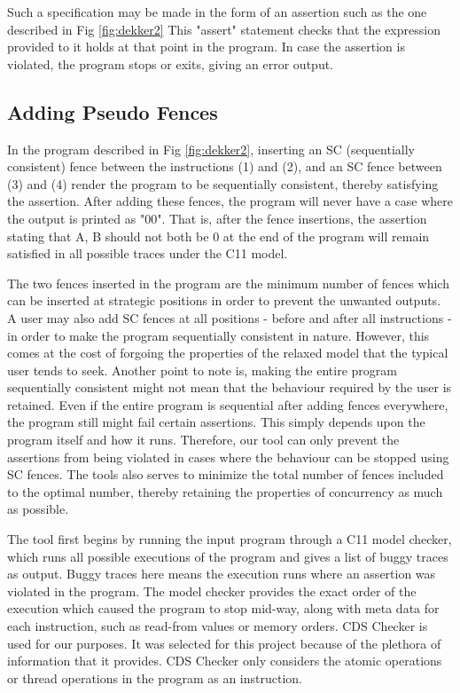\par
Such a specification may be made in the form of an assertion such as the one described in Fig \ref{fig:dekker2} This "assert" statement checks that the expression provided to it holds at that point in the program. In case the assertion is violated, the program stops or exits, giving an error output. 

\subsection{Adding Pseudo Fences}
In the program described in Fig \ref{fig:dekker2}, inserting an SC (sequentially consistent) fence between the instructions (1) and (2), and an SC fence between (3) and (4) render the program to be sequentially consistent, thereby satisfying the assertion. After adding these fences, the program will never have a case where the output is printed as "00". That is, after the fence insertions, the assertion stating that A, B should not both be 0 at the end of the program will remain satisfied in all possible traces under the C11 model.

\par
The two fences inserted in the program are the minimum number of fences which can be inserted at strategic positions in order to prevent the unwanted outputs. A user may also add SC fences at all positions - before and after all instructions - in order to make the program sequentially consistent in nature. However, this comes at the cost of forgoing the properties of the relaxed model that the typical user tends to seek. Another point to note is, making the entire program sequentially consistent might not mean that the behaviour required by the user is retained. Even if the entire program is sequential after adding fences everywhere, the program still might fail certain assertions. This simply depends upon the program itself and how it runs. Therefore, our tool can only prevent the assertions from being violated in cases where the behaviour can be stopped using SC fences. The tools also serves to minimize the total number of fences included to the optimal number, thereby retaining the properties of concurrency as much as possible.

\par
The tool first begins by running the input program through a C11 model checker, which runs all possible executions of the program and gives a list of buggy traces as output. Buggy traces here means the execution runs where an assertion was violated in the program. The model checker provides the exact order of the execution which caused the program to stop mid-way, along with meta data for each instruction, such as read-from values or memory orders. CDS Checker is used for our purposes. It was selected for this project because of the plethora of information that it provides. CDS Checker only considers the atomic operations or thread operations in the program as an instruction.

